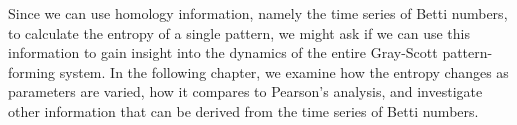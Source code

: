 Since we can use homology information, namely the time series of Betti numbers, to calculate the entropy of a single pattern, we might ask if we can use this information to gain insight into the dynamics of the entire Gray-Scott pattern-forming system. In the following chapter, we examine how the entropy changes as parameters are varied, how it compares to Pearson's analysis, and investigate other information that can be derived from the time series of Betti numbers.


